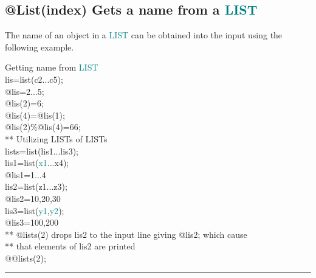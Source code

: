 \subsection{@List(index) Gets a name from a \textcolor{teal}{LIST}} 
\label{inpulistelem} 
The name of an object in a \textcolor{teal}{LIST} can be obtained into the input using the following example. 
\singlespacing 
\begin{example}[inpulistelem]Getting name from \textcolor{teal}{LIST}\\ 
\label{inpulistelem} 
\noindent lis=\textcolor{VioletRed}{list}(c2...c5);\\ 
@lis=2...5;\\ 
@lis(2)=6;\\ 
@lis(4)=@lis(1);\\ 
@lis(2)\%@lis(4)=66;\\ 
{\color{ForestGreen}** Utilizing LISTs  of LISTs}\\ 
lists=\textcolor{VioletRed}{list}(lis1...lis3);\\ 
lis1=\textcolor{VioletRed}{list}(\textcolor{teal}{x1}...x4);\\ 
@lis1=1...4\\ 
lis2=\textcolor{VioletRed}{list}(z1...z3);\\ 
@lis2=10,20,30\\ 
lis3=\textcolor{VioletRed}{list}(\textcolor{teal}{y1},\textcolor{teal}{y2});\\ 
@lis3=100,200\\ 
{\color{ForestGreen}** @lists(2) drops lis2 to the input line giving @lis2; which cause}\\ 
{\color{ForestGreen}** that elements of lis2 are printed}\\ 
@@lists(2);\\ 
\end{example} 
\vspace{-7mm} \rule{5cm}{0.1pt} 
\onehalfspacing 
